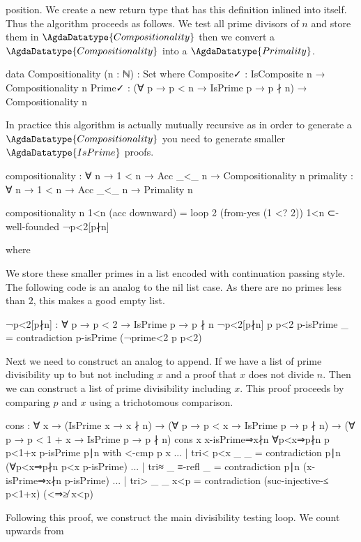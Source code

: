 \documentclass[./Thesis.tex]{subfiles}
\begin{document}
position. We create a new return type that has this definition inlined into
itself. Thus the algorithm proceeds as follows. We test all prime divisors of
$n$ and store them in $\AgdaDatatype{Compositionality}$ then we convert a
$\AgdaDatatype{Compositionality}$ into a $\AgdaDatatype{Primality}$.
\begin{code}
  data Compositionality (n : ℕ) : Set where
    Composite✓ : IsComposite n → Compositionality n
    Prime✓ : (∀ {p} → p < n → IsPrime p → p ∤ n) → Compositionality n
\end{code}
In practice this algorithm is actually mutually recursive as in order to generate
a $\AgdaDatatype{Compositionality}$ you need to generate smaller
$\AgdaDatatype{IsPrime}$ proofs.
\begin{code}
  compositionality : ∀ n → 1 < n → Acc _<_ n → Compositionality n
  primality : ∀ n → 1 < n → Acc _<_ n → Primality n
\end{code}
\begin{code}
  compositionality n 1<n (acc downward)
    = loop 2 (from-yes (1 <? 2)) 1<n ⊂-well-founded ¬p<2[p∤n]
\end{code}
\begin{code}[hide]
    where
\end{code}
We store these smaller primes in a list encoded with continuation passing style.
The following code is an analog to the nil list case. As there are no primes
less than $2$, this makes a good empty list.
\begin{code}
    ¬p<2[p∤n] : ∀ {p} → p < 2 → IsPrime p → p ∤ n
    ¬p<2[p∤n] {p} p<2 p-isPrime _ = contradiction p-isPrime (¬prime<2 p p<2)
\end{code}
Next we need to construct an analog to append. If we have a list of prime
divisibility up to but not including $x$ and a proof that $x$ does not
divide $n$. Then we can construct a list of prime divisibility including $x$. This
proof proceeds by comparing $p$ and $x$ using a trichotomous comparison.
\begin{code}
    cons
      : ∀ {x}
      → (IsPrime x → x ∤ n)
      → (∀ {p} → p < x → IsPrime p → p ∤ n)
      → (∀ {p} → p < 1 + x → IsPrime p → p ∤ n)
    cons {x} x-isPrime⇒x∤n ∀p<x⇒p∤n {p} p<1+x p-isPrime p∣n with <-cmp p x
    ... | tri< p<x _ _ = contradiction p∣n (∀p<x⇒p∤n p<x p-isPrime)
    ... | tri≈ _ ≡-refl _ = contradiction p∣n (x-isPrime⇒x∤n p-isPrime)
    ... | tri> _ _ x<p = contradiction (suc-injective-≤ p<1+x) (<⇒≱ x<p)
\end{code}
Following this proof, we construct the main divisibility testing loop. We count upwards from
\end{document}
